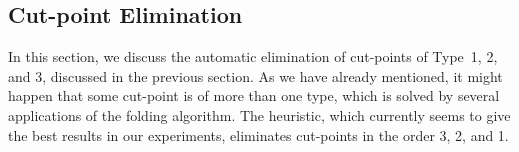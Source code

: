 \subsection{Cut-point Elimination}
\label{ref:cpelim}

In this section, we discuss the automatic elimination of cut-points of Type~1, 2, and 3, discussed
in the previous section.
As we have already mentioned, it might happen that some cut-point is of more than one
type, which is solved by several applications of the folding algorithm. The heuristic,
which currently seems to give the best results in our experiments, eliminates cut-points
in the order 3, 2, and 1.

